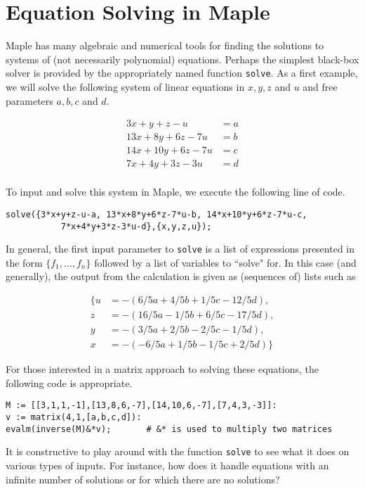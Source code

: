 \documentclass[12pt]{amsart}
\begin{document}
\section{Equation Solving in Maple}

Maple has many algebraic and numerical tools for finding the solutions to
systems of (not necessarily polynomial) equations.  Perhaps the simplest black-box
solver is provided by the appropriately named function \texttt{solve}.
As a first example, we will solve the following 
system of linear equations in $x,y,z$ and $u$ and free parameters $a,b,c$ and $d$.  

\begin{align*}
3x  + y   + z  - u  &= a\\
13x + 8y  + 6z - 7u &= b\\
14x + 10y + 6z - 7u &= c\\ 
7x  + 4y  + 3z - 3u &= d\\
\end{align*}

To input and solve this system in Maple, we execute the following line of code.

\begin{verbatim}
solve({3*x+y+z-u-a, 13*x+8*y+6*z-7*u-b, 14*x+10*y+6*z-7*u-c,
	       7*x+4*y+3*z-3*u-d},{x,y,z,u});
\end{verbatim}

In general, the first input parameter to \texttt{solve} is a list of expressions 
presented in the form $\{f_1,\dots,f_n\}$ followed by a list of variables to ``solve" for.  In this
case (and generally), the output from the calculation is given as (sequences of) lists such as

\begin{align*}
\{u &= -(6/5a+4/5b+1/5c-12/5d),\\
z &= -(16/5a-1/5b+6/5c-17/5d),\\
y &= -(3/5a+2/5b-2/5c-1/5d),\\
x &= -(-6/5a+1/5b-1/5c+2/5d)\}
\end{align*}

For those interested in a matrix approach to solving these equations, the following
code is appropriate.

\begin{verbatim}
M := [[3,1,1,-1],[13,8,6,-7],[14,10,6,-7],[7,4,3,-3]]:
v := matrix(4,1,[a,b,c,d]):
evalm(inverse(M)&*v);   	# &* is used to multiply two matrices
\end{verbatim}

It is constructive to play around with the function \texttt{solve} to see what it does
on various types of inputs.  For instance, how does it handle equations with an infinite number
of solutions or for which there are no solutions?  
\end{document}
